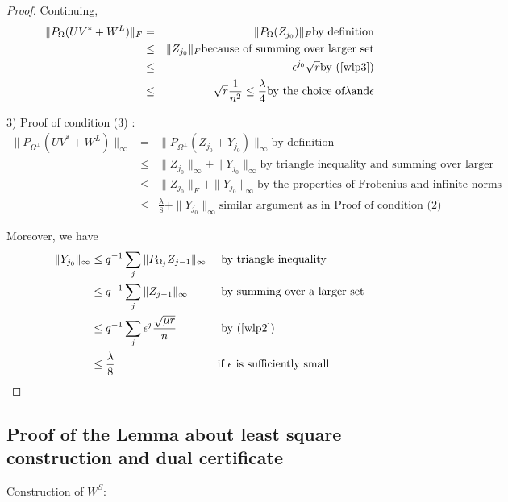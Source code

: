 \begin{proof}
Continuing,
\begin{eqnarray*}
\|P_{\Omega}(UV^{*}+W^{L})\|_{F} & = & \|P_{\Omega}(Z_{j_{0}})\|_{F} \text{by definition}\\
 & \le & \|Z_{j_{0}}\|_{F} \text{because of summing over larger set} \\
 & \le & \epsilon^{j_{0}}\sqrt{r} \text{by (\ref{wlp3})} \\
 & \le & \sqrt{r}\frac{1}{n^{2}}\le\frac{\lambda}{4} \text{by the choice of} \lambda \text{and} \epsilon
\end{eqnarray*}


3) Proof of condition (3) :
\begin{eqnarray*}
\|P_{\Omega^{\bot}}(UV^{*}+W^{L})\|_{\infty} & = & \|P_{\Omega^{\bot}}(Z_{j_{0}}+Y_{j_{0}})\|_{\infty}\text{by definition}\\
 & \le & \|Z_{j_{0}}\|_{\infty}+\|Y_{j_{0}}\|_{\infty} \text{by triangle inequality and summing over larger set}\\
 & \le & \|Z_{j_{0}}\|_{F}+\|Y_{j_{0}}\|_{\infty} \text{by the properties of Frobenius and infinite norms}\\
 & \le & \frac{\lambda}{8}+\|Y_{j_{0}}\|_{\infty} \text{similar argument as in Proof of condition (2)}
\end{eqnarray*}


Moreover, we have
\[
\begin{aligned}
\|Y_{j_{0}}\|_{\infty} 
& \le q^{-1}\sum_{j}\|P_{\Omega_{j}}Z_{j-1}\|_{\infty} 
&&\text{ by triangle inequality}\\
& \le q^{-1}\sum_{j}\|Z_{j-1}\|_{\infty} 
&&\text{ by summing over a larger set}\\
& \le q^{-1}\sum_{j}\epsilon^{j}\frac{\sqrt{\mu r}}{n} 
&&\text{ by (\ref{wlp2})}\\
& \le \frac{\lambda}{8}
&&\text{if } \epsilon \text{ is sufficiently small}
\end{aligned}
\]

\end{proof}


\subsection{Proof of the Lemma about least square construction and dual certificate }

Construction of $W^{S}$:

